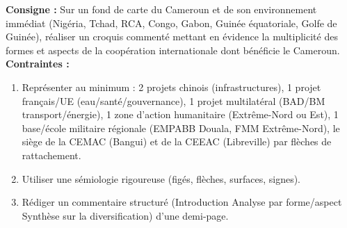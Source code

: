 \documentclass[11pt]{article}
\begin{document}
\begin{exercice}
\textbf{Consigne :} Sur un fond de carte du Cameroun et de son environnement immédiat (Nigéria, Tchad, RCA, Congo, Gabon, Guinée équatoriale, Golfe de Guinée), réaliser un croquis commenté mettant en évidence la multiplicité des formes et aspects de la coopération internationale dont bénéficie le Cameroun.
\textbf{Contraintes :}
\begin{enumerate}
    \item Représenter au minimum : 2 projets chinois (infrastructures), 1 projet français/UE (eau/santé/gouvernance), 1 projet multilatéral (BAD/BM transport/énergie), 1 zone d'action humanitaire (Extrême-Nord ou Est), 1 base/école militaire régionale (EMPABB Douala, FMM Extrême-Nord), le siège de la CEMAC (Bangui) et de la CEEAC (Libreville) par flèches de rattachement.
    \item Utiliser une sémiologie rigoureuse (figés, flèches, surfaces, signes).
    \item Rédiger un commentaire structuré (Introduction \rightarrow Analyse par forme/aspect \rightarrow Synthèse sur la diversification) d'une demi-page.
\end{enumerate}
\end{exercice}
\end{document}
